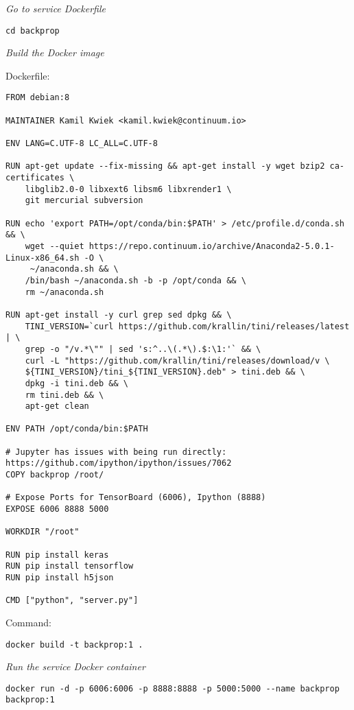 \emph{Go to service Dockerfile}
 \begin{lstlisting}
cd backprop
\end{lstlisting}

\emph{Build the Docker image}

Dockerfile:
 \begin{lstlisting}
FROM debian:8

MAINTAINER Kamil Kwiek <kamil.kwiek@continuum.io>

ENV LANG=C.UTF-8 LC_ALL=C.UTF-8

RUN apt-get update --fix-missing && apt-get install -y wget bzip2 ca-certificates \
    libglib2.0-0 libxext6 libsm6 libxrender1 \
    git mercurial subversion

RUN echo 'export PATH=/opt/conda/bin:$PATH' > /etc/profile.d/conda.sh && \
    wget --quiet https://repo.continuum.io/archive/Anaconda2-5.0.1-Linux-x86_64.sh -O \
     ~/anaconda.sh && \
    /bin/bash ~/anaconda.sh -b -p /opt/conda && \
    rm ~/anaconda.sh

RUN apt-get install -y curl grep sed dpkg && \
    TINI_VERSION=`curl https://github.com/krallin/tini/releases/latest | \
    grep -o "/v.*\"" | sed 's:^..\(.*\).$:\1:'` && \
    curl -L "https://github.com/krallin/tini/releases/download/v \
    ${TINI_VERSION}/tini_${TINI_VERSION}.deb" > tini.deb && \
    dpkg -i tini.deb && \
    rm tini.deb && \
    apt-get clean

ENV PATH /opt/conda/bin:$PATH

# Jupyter has issues with being run directly: https://github.com/ipython/ipython/issues/7062
COPY backprop /root/

# Expose Ports for TensorBoard (6006), Ipython (8888)
EXPOSE 6006 8888 5000

WORKDIR "/root"

RUN pip install keras
RUN pip install tensorflow
RUN pip install h5json

CMD ["python", "server.py"]
\end{lstlisting}

Command: 

 \begin{lstlisting}
docker build -t backprop:1 .
\end{lstlisting}


\emph{Run the service Docker container}
 \begin{lstlisting}
docker run -d -p 6006:6006 -p 8888:8888 -p 5000:5000 --name backprop backprop:1
\end{lstlisting}







